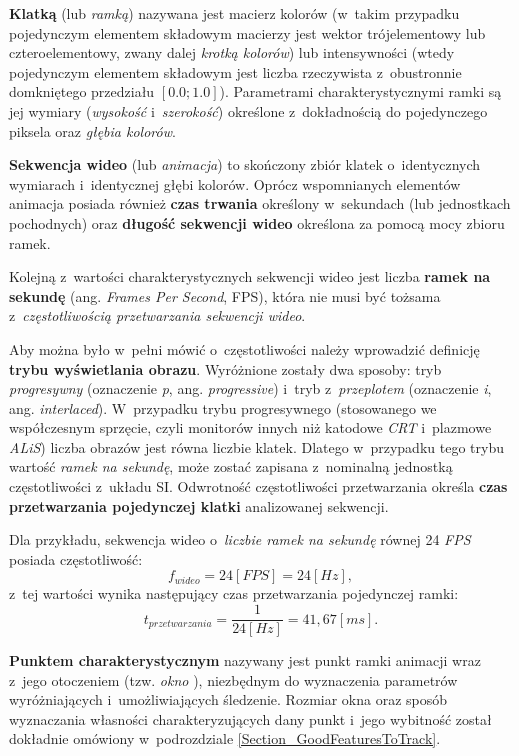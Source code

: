     \textbf{Klatką} (lub \textit{ramką}) nazywana jest macierz kolorów (w~takim przypadku pojedynczym elementem składowym macierzy jest wektor trójelementowy lub czteroelementowy, zwany dalej \textit{krotką kolorów}) lub intensywności (wtedy pojedynczym elementem składowym jest liczba rzeczywista z~obustronnie domkniętego przedziału $[0.0; 1.0]$). Parametrami charakterystycznymi ramki są jej wymiary (\textit{wysokość} i~\textit{szerokość}) określone z~dokładnością do pojedynczego piksela oraz \textit{głębia kolorów}.

    \textbf{Sekwencja wideo} (lub \textit{animacja}) to skończony zbiór klatek o~identycznych wymiarach i~identycznej głębi kolorów. Oprócz wspomnianych elementów animacja posiada również \textbf{czas trwania} określony w~sekundach (lub jednostkach pochodnych) oraz \textbf{długość sekwencji wideo} określona za pomocą mocy zbioru ramek.

    Kolejną z~wartości charakterystycznych sekwencji wideo jest liczba \textbf{ramek na sekundę} (ang. \textit{Frames Per Second}, FPS), która nie musi być tożsama z~\textit{częstotliwością przetwarzania sekwencji wideo}.

    Aby można było w~pełni mówić o~częstotliwości należy wprowadzić definicję \textbf{trybu wyświetlania obrazu}. Wyróżnione zostały dwa sposoby: tryb \textit{progresywny} (oznaczenie \textit{p}, ang. \textit{progressive}) i~tryb z~\textit{przeplotem} (oznaczenie \textit{i}, ang. \textit{interlaced}). W~przypadku trybu progresywnego (stosowanego we współczesnym sprzęcie, czyli monitorów innych niż katodowe \textit{CRT} i~plazmowe \textit{ALiS}) liczba obrazów jest równa liczbie klatek. Dlatego w~przypadku tego trybu wartość \textit{ramek na sekundę}, może zostać zapisana z~nominalną jednostką częstotliwości z~układu SI. Odwrotność częstotliwości przetwarzania określa \textbf{czas przetwarzania pojedynczej klatki} analizowanej sekwencji.

    Dla przykładu, sekwencja wideo o~\textit{liczbie ramek na sekundę} równej 24 \textit{FPS} posiada częstotliwość:
    \begin{equation}
      f_{wideo} = 24 [FPS] = 24 [Hz],
    \end{equation}
    z~tej wartości wynika następujący czas przetwarzania pojedynczej ramki:
    \begin{equation}
      t_{przetwarzania} = \frac{1}{24 [Hz]} = 41,67 [ms].
    \end{equation}

    \textbf{Punktem charakterystycznym} nazywany jest punkt ramki animacji wraz z~jego otoczeniem (tzw. \textit{okno} \cite{SalientPointsTracking05}), niezbędnym do wyznaczenia parametrów wyróżniających i~umożliwiających śledzenie. Rozmiar okna oraz sposób wyznaczania własności charakteryzujących dany punkt i~jego wybitność został dokładnie omówiony w~podrozdziale \ref{Section_GoodFeaturesToTrack}.

